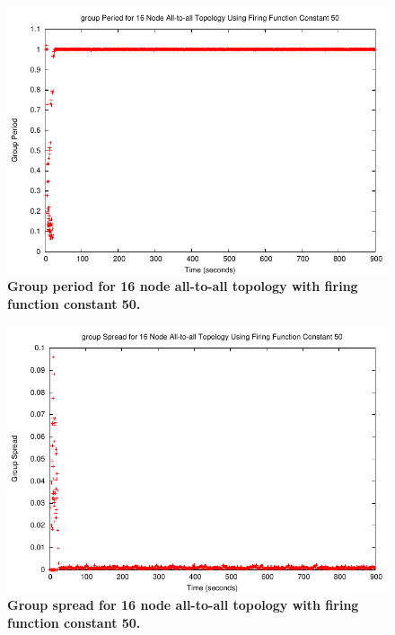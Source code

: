 \begin{figure}[t]
\begin{center}
\includegraphics[width=1.0\hsize]{./figures/5-Jan-2005-1-ALL-NODES-16-50CONSTANT-GROUP-PERIOD.pdf}
\end{center}
\caption{{\small {\bf Group period for 16 node all-to-all topology with firing function constant 50.} }}
\label{fig:agp}
\end{figure}

\begin{figure}[t]
\begin{center}
\includegraphics[width=1.0\hsize]{./figures/5-Jan-2005-1-ALL-NODES-16-50CONSTANT-GROUP-SPREAD.pdf}
\end{center}
\caption{{\small {\bf Group spread for 16 node all-to-all topology with firing function constant 50.} }}
\label{fig:ags}
\end{figure}


